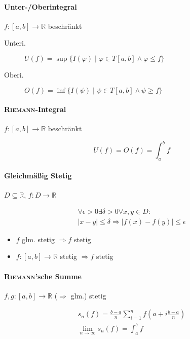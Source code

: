 \paragraph{Unter-/Oberintegral} $f: [a, b] \rightarrow \mathbb{R}$ beschränkt

\begin{description}
  \item[Unteri.] $U(f) = \sup\{ I(\varphi) \mid \varphi \in T[a, b] \land \varphi \leq f \}$
  \item[Oberi.] $O(f) = \inf\{ I(\psi) \mid \psi \in T[a, b] \land \psi \geq f \}$
\end{description}

\paragraph{\textsc{Riemann}-Integral} $f: [a, b] \rightarrow \mathbb{R}$ beschränkt

$$U(f) = O(f) = \int_a^b f$$

\paragraph{Gleichmä\ss ig Stetig} $D \subseteq \mathbb{R}$, $f: D \rightarrow \mathbb{R}$

\begin{gather*}
  \forall \epsilon > 0 \exists \delta > 0 \forall x, y \in D: \\
  |x - y| \leq \delta \Rightarrow |f(x) - f(y)| \leq \epsilon
\end{gather*}

\begin{itemize}
  \item $f$ glm. stetig $\Rightarrow f$ stetig
  \item $f: [a, b] \rightarrow \mathbb{R}$ stetig $\Rightarrow f$ stetig
\end{itemize}

\paragraph{\textsc{Riemann}'sche Summe} $f,g: [a, b] \rightarrow \mathbb{R}$ ($\Rightarrow$ glm.) stetig

\begin{gather*}
  s_n(f) = \frac{b - a}{n} \sum_{i = 1}^{n} f(a + i\frac{b - a}{n}) \\
  \lim_{n \rightarrow \infty} s_n (f) = \int_{a}^{b} f
\end{gather*}

